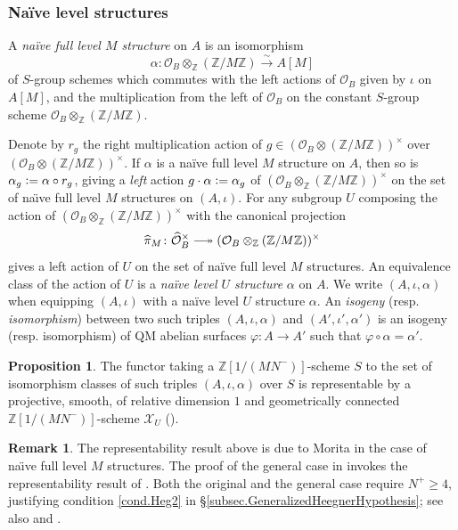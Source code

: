 \documentclass[a4paper]{amsart}
\numberwithin{equation}{section}
\theoremstyle{definition}
\newtheorem{proposition}[theorem]{Proposition}
\newtheorem{remark}[theorem]{Remark}
\newcommand{\Z}{\mathbb{Z}}
\newcommand{\defeq}{\vcentcolon=}
\newcommand{\longepi}{\mbox{\;$\relbar\joinrel\twoheadrightarrow$\;}}
\begin{document}
\subsubsection{Naïve level structures}\label{subsec.NaiveLevelStructures}
A \textit{naïve full level $M$ structure} on $A$ is an isomorphism \[\alpha\colon\mathcal{O}_B\otimes_\Z(\Z/{M}\Z)\stackrel{\sim}{\longrightarrow} A[{M}]\] of $S$-group schemes which commutes with the left actions of $\mathcal{O}_B$ given by $\iota$ on $A[M]$, and the multiplication from the left of $\mathcal{O}_B$ on the constant $S$-group scheme $\mathcal{O}_B\otimes_\Z(\Z/{M}\Z)$. 

Denote by $r_g$ the right multiplication action of $g\in(\mathcal{O}_B\otimes(\Z/M\Z))^\times$ over $(\mathcal{O}_B\otimes(\Z/M\Z))^\times$. If $\alpha$ is a naïve full level $M$ structure on $A$, then so is $\alpha_g\defeq\alpha\circ r_g$, giving a \textit{left} action $g\cdot\alpha\defeq\alpha_g$ of $(\mathcal{O}_B\otimes_\Z(\Z/M\Z))^\times$ on the set of na\"{\i}ve full level $M$ structures on $(A,\iota)$. For any subgroup $U$ composing the action of $(\mathcal{O}_B\otimes_\Z(\Z/M\Z))^\times$ with the canonical projection \[\widehat{\pi}_M\colon\widehat{\mathcal{O}}_B^\times\longepi(\mathcal{O}_B\otimes_\Z(\Z/M\Z))^\times\] gives a left action of $U$ on the set of naïve full level $M$ structures. An equivalence class of the action of $U$ is a \emph{naïve level $U$ structure} $\alpha$ on $A$. We write $(A,\iota,\alpha)$ when equipping $(A,\iota)$ with a naïve level $U$ structure $\alpha$. An \textit{isogeny} (resp. \textit{isomorphism}) between two such triples $(A,\iota,\alpha)$ and $(A',\iota',\alpha')$ is an isogeny (resp. isomorphism) of QM abelian surfaces $\varphi\colon A\rightarrow A'$ such that $\varphi\circ\alpha=\alpha'$.

\begin{proposition}\label{prop.ModuliNaive}
The functor taking a $\Z[1/(MN^-)]$-scheme $S$ to the set of isomorphism classes of such triples $(A,\iota,\alpha)$ over $S$ is representable 
by a  projective, smooth, of relative dimension $1$ and geometrically connected $\Z[1/(MN^-)]$-scheme $\mathcal{X}_U$ (\cite[Theorem 2.1]{Buzzard}).
\end{proposition}

\begin{remark}\label{rem.Representability}
The representability result above is due to Morita \cite[Main Theorem 1]{Morita} in the case of na\"{\i}ve full level $M$ structures. The proof of the general case in \cite[\S2]{Buzzard} invokes the representability result of \cite[Theorem \S14, Exposé III]{Boutot}. Both the original and the general case require $N^{+}\ge 4$, justifying condition \ref{cond.Heg2} in \S\ref{subsec.GeneralizedHeegnerHypothesis}; see also \cite[\S4]{DiamondTaylor} and \cite[Theorem 2.2]{Brooks}. 
\end{remark}
\end{document}
